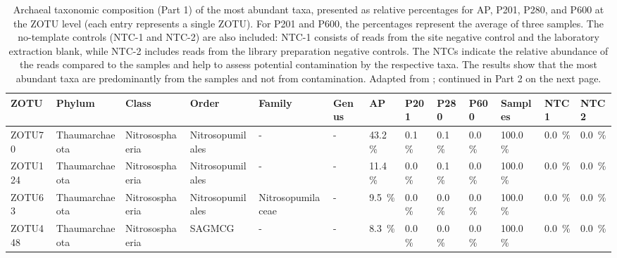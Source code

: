 \begin{table}  %
\centering
\begin{adjustbox}{max width=0.8\textwidth, max totalheight=0.85\textheight, keepaspectratio}
\renewcommand{\arraystretch}{1.5} %
\footnotesize %
\caption{Archaeal taxonomic composition (Part 1) of the most abundant taxa, presented as relative percentages for AP, P201, P280, and P600 at the ZOTU level (each entry represents a single ZOTU).
For P201 and P600, the percentages represent the average of three samples.
The no-template controls (NTC-1 and NTC-2) are also included: NTC-1 consists of reads from the site negative control and the laboratory extraction blank, while NTC-2 includes reads from the library preparation negative controls.
The NTCs indicate the relative abundance of the reads compared to the samples and help to assess potential contamination by the respective taxa.
The results show that the most abundant taxa are predominantly from the samples and not from contamination.
Adapted from \cite{giroud2025microbio}; continued in Part 2 on the next page.}
\label{tabSI:tax_arc_1}
\begin{tabular}{llllllllll||lll}
\toprule
\textbf{ZOTU} & \textbf{Phylum} & \textbf{Class} & \textbf{Order} & \textbf{Family} & \textbf{Genus} & \textbf{AP} & \textbf{P201} & \textbf{P280} & \textbf{P600} & \textbf{Samples} & \textbf{NTC1} & \textbf{NTC2} \\
\midrule
ZOTU70 & Thaumarchaeota & Nitrososphaeria & Nitrosopumilales & - & - & \SI{43.2}{\percent} & \SI{0.1}{\percent} & \SI{0.1}{\percent} & \SI{0.0}{\percent} & \SI{100.0}{\percent} & \SI{0.0}{\percent} & \SI{0.0}{\percent} \\
ZOTU124 & Thaumarchaeota & Nitrososphaeria & Nitrosopumilales & - & - & \SI{11.4}{\percent} & \SI{0.0}{\percent} & \SI{0.1}{\percent} & \SI{0.0}{\percent} & \SI{100.0}{\percent} & \SI{0.0}{\percent} & \SI{0.0}{\percent} \\
ZOTU63 & Thaumarchaeota & Nitrososphaeria & Nitrosopumilales & Nitrosopumilaceae & - & \SI{9.5}{\percent} & \SI{0.0}{\percent} & \SI{0.0}{\percent} & \SI{0.0}{\percent} & \SI{100.0}{\percent} & \SI{0.0}{\percent} & \SI{0.0}{\percent} \\
ZOTU448 & Thaumarchaeota & Nitrososphaeria & SAGMCG & - & - & \SI{8.3}{\percent} & \SI{0.0}{\percent} & \SI{0.0}{\percent} & \SI{0.0}{\percent} & \SI{100.0}{\percent} & \SI{0.0}{\percent} & \SI{0.0}{\percent} \\

\end{tabular}
\end{adjustbox}
\end{table}
